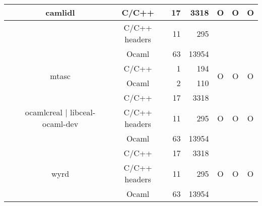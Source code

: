 \documentclass[11pt,a4paper]{article}
\begin{document}
\begin{table}[h,t]
\begin{tabular}{|>{\centering}m{3cm}| c|c|r|r| c| c|c|}
& \multirow{3}{*}{camlidl} & C/C++ & 17 & 3318 & \multirow{3}{*}{O} & \multirow{3}{*}{O} & \multirow{3}{*}{O}\\
 \cline{3-5}
 &  &                           C/C++ headers & 11 & 295 & & & \\
 \cline{3-5}
 & &                           Ocaml & 63 & 13954 & & & \\
 \cline{2-8}


 &\multirow{2}{*}{mtasc} & C/C++ & 1 & 194  & \multirow{2}{*}{O} & \multirow{2}{*}{O} &

 \multirow{2}{*}{O}\\
 \cline{3-5}   
 &                                  & Ocaml & 2 & 110  & & & \\       
 \cline{2-8}





& \multirow{3}{3cm}{ocamlcreal | libceal-ocaml-dev} & C/C++ & 17 & 3318 & \multirow{3}{*}{O} & \multirow{3}{*}{O} & \multirow{3}{*}{O}\\
 \cline{3-5}
 &  &                           C/C++ headers & 11 & 295 & & & \\
 \cline{3-5}
 & &                           Ocaml & 63 & 13954 & & & \\
 \cline{2-8}

& \multirow{3}{*}{wyrd} & C/C++ & 17 & 3318 & \multirow{3}{*}{O} & \multirow{3}{*}{O} & \multirow{3}{*}{O}\\
 \cline{3-5}
 &  &                           C/C++ headers & 11 & 295 & & & \\
 \cline{3-5}
 & &                           Ocaml & 63 & 13954 & & & \\
 \hline






\end{tabular}
\end{table}


\end{document}
